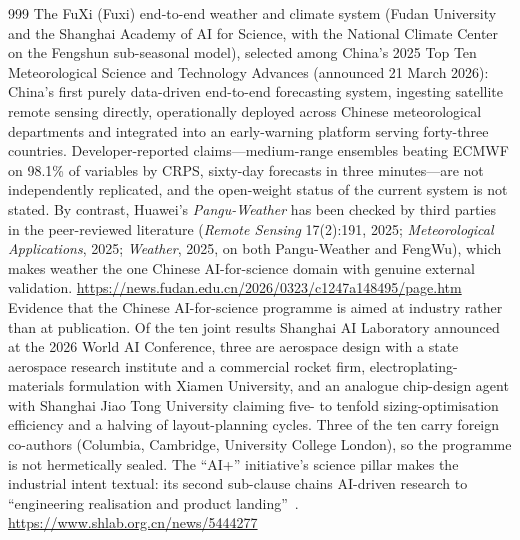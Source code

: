 \begin{thebibliography}{999}
 The FuXi (Fuxi) end-to-end weather and climate system (Fudan University and the Shanghai Academy of AI for Science, with the National Climate Center on the Fengshun sub-seasonal model), selected among China's 2025 Top Ten Meteorological Science and Technology Advances (announced 21 March 2026): China's first purely data-driven end-to-end forecasting system, ingesting satellite remote sensing directly, operationally deployed across Chinese meteorological departments and integrated into an early-warning platform serving forty-three countries. Developer-reported claims---medium-range ensembles beating ECMWF on 98.1\% of variables by CRPS, sixty-day forecasts in three minutes---are not independently replicated, and the open-weight status of the current system is not stated. By contrast, Huawei's \emph{Pangu-Weather} has been checked by third parties in the peer-reviewed literature (\emph{Remote Sensing} 17(2):191, 2025; \emph{Meteorological Applications}, 2025; \emph{Weather}, 2025, on both Pangu-Weather and FengWu), which makes weather the one Chinese AI-for-science domain with genuine external validation. \url{https://news.fudan.edu.cn/2026/0323/c1247a148495/page.htm}
 Evidence that the Chinese AI-for-science programme is aimed at industry rather than at publication. Of the ten joint results Shanghai AI Laboratory announced at the 2026 World AI Conference, three are aerospace design with a state aerospace research institute and a commercial rocket firm, electroplating-materials formulation with Xiamen University, and an analogue chip-design agent with Shanghai Jiao Tong University claiming five- to tenfold sizing-optimisation efficiency and a halving of layout-planning cycles. Three of the ten carry foreign co-authors (Columbia, Cambridge, University College London), so the programme is not hermetically sealed. The ``AI+'' initiative's science pillar makes the industrial intent textual: its second sub-clause chains AI-driven research to ``engineering realisation and product landing''~\cite{ai-plus-science}. \url{https://www.shlab.org.cn/news/5444277}


\end{thebibliography}
